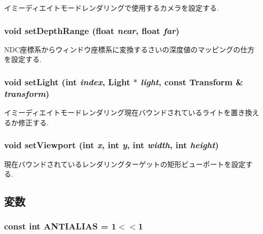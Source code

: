 イミーディエイトモードレンダリングで使用するカメラを設定する. \hypertarget{classm3g_1_1Graphics3D_6fc3837286f3516aa3320aeec9729495}{
\subsubsection[{setDepthRange}]{\setlength{\rightskip}{0pt plus 5cm}void setDepthRange (float {\em near}, \/  float {\em far})}}
\label{classm3g_1_1Graphics3D_6fc3837286f3516aa3320aeec9729495}


NDC座標系からウィンドウ座標系に変換するさいの深度値のマッピングの仕方を設定する. \hypertarget{classm3g_1_1Graphics3D_2bf83cb69f50117dd9d5548fe96d0ab0}{
\subsubsection[{setLight}]{\setlength{\rightskip}{0pt plus 5cm}void setLight (int {\em index}, \/  {\bf Light} $\ast$ {\em light}, \/  const {\bf Transform} \& {\em transform})}}
\label{classm3g_1_1Graphics3D_2bf83cb69f50117dd9d5548fe96d0ab0}


イミーディエイトモードレンダリング現在バウンドされているライトを置き換えるか修正する. \hypertarget{classm3g_1_1Graphics3D_0b4ec48e9c19060e9be5648c118c23b1}{
\subsubsection[{setViewport}]{\setlength{\rightskip}{0pt plus 5cm}void setViewport (int {\em x}, \/  int {\em y}, \/  int {\em width}, \/  int {\em height})}}
\label{classm3g_1_1Graphics3D_0b4ec48e9c19060e9be5648c118c23b1}


現在バウンドされているレンダリングターゲットの矩形ビューポートを設定する. 

\subsection{変数}
\hypertarget{classm3g_1_1Graphics3D_9df12c5332904e66a962e1bf2809a812}{
\subsubsection[{ANTIALIAS}]{\setlength{\rightskip}{0pt plus 5cm}const int {\bf ANTIALIAS} = 1$<$$<$1}}
\label{classm3g_1_1Graphics3D_9df12c5332904e66a962e1bf2809a812}



